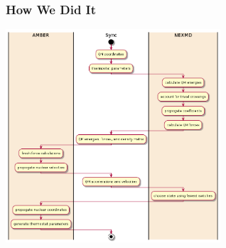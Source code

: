 \documentclass{beamer}
\begin{document}
\begin{frame}
  \frametitle{How We Did It}
  \begin{center}
  \includegraphics[width=0.6\textwidth]{Images/nasqm_overview.png}
  \end{center}
\end{frame}
\end{document}
